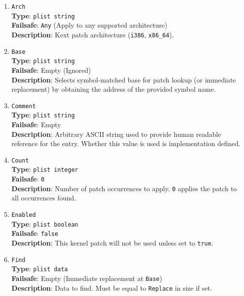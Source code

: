 \documentclass[]{article}
\begin{document}
\begin{enumerate}

\item
  \texttt{Arch}\\
  \textbf{Type}: \texttt{plist\ string}\\
  \textbf{Failsafe}: \texttt{Any} (Apply to any supported architecture)\\
  \textbf{Description}: Kext patch architecture (\texttt{i386}, \texttt{x86\_64}).

\item
  \texttt{Base}\\
  \textbf{Type}: \texttt{plist\ string}\\
  \textbf{Failsafe}: Empty (Ignored)\\
  \textbf{Description}: Selects symbol-matched base for patch lookup (or immediate
  replacement) by obtaining the address of the provided symbol name.

\item
  \texttt{Comment}\\
  \textbf{Type}: \texttt{plist\ string}\\
  \textbf{Failsafe}: Empty\\
  \textbf{Description}: Arbitrary ASCII string used to provide human readable
  reference for the entry. Whether this value is used is implementation defined.

\item
  \texttt{Count}\\
  \textbf{Type}: \texttt{plist\ integer}\\
  \textbf{Failsafe}: \texttt{0}\\
  \textbf{Description}: Number of patch occurrences to apply. \texttt{0} applies
  the patch to all occurrences found.

\item
  \texttt{Enabled}\\
  \textbf{Type}: \texttt{plist\ boolean}\\
  \textbf{Failsafe}: \texttt{false}\\
  \textbf{Description}: This kernel patch will not be used unless set to
  \texttt{true}.

\item
  \texttt{Find}\\
  \textbf{Type}: \texttt{plist\ data}\\
  \textbf{Failsafe}: Empty (Immediate replacement at \texttt{Base})\\
  \textbf{Description}: Data to find. Must be equal to \texttt{Replace}
  in size if set.


\end{enumerate}
\end{document}
